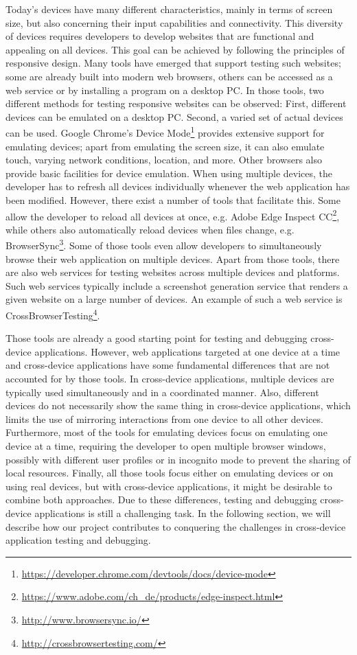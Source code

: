 Today's devices have many different characteristics, mainly in terms of screen size, but also concerning their input capabilities and connectivity. This diversity of devices requires developers to develop websites that are functional and appealing on all devices. This goal can be achieved by following the principles of responsive design. Many tools have emerged that support testing such websites; some are already built into modern web browsers, others can be accessed as a web service or by installing a program on a desktop PC. In those tools, two different methods for testing responsive websites can be observed: First, different devices can be emulated on a desktop PC. Second, a varied set of actual devices can be used. Google Chrome's Device Mode\footnote{\url{https://developer.chrome.com/devtools/docs/device-mode}} provides extensive support for emulating devices; apart from emulating the screen size, it can also emulate touch, varying network conditions, location, and more. Other browsers also provide basic facilities for device emulation. When using multiple devices, the developer has to refresh all devices individually whenever the web application has been modified. However, there exist a number of tools that facilitate this. Some allow the developer to reload all devices at once, e.g. Adobe Edge Inspect CC\footnote{\url{https://www.adobe.com/ch_de/products/edge-inspect.html}}, while others also automatically reload devices when files change, e.g. BrowserSync\footnote{\url{http://www.browsersync.io/}}. Some of those tools even allow developers to simultaneously browse their web application on multiple devices. Apart from those tools, there are also web services for testing websites across multiple devices and platforms. Such web services typically include a screenshot generation service that renders a given website on a large number of devices. An example of such a web service is CrossBrowserTesting\footnote{\url{http://crossbrowsertesting.com/}}.

Those tools are already a good starting point for testing and debugging cross-device applications. However, web applications targeted at one device at a time and cross-device applications have some fundamental differences that are not accounted for by those tools. In cross-device applications, multiple devices are typically used simultaneously and in a coordinated manner. Also, different devices do not necessarily show the same thing in cross-device applications, which limits the use of mirroring interactions from one device to all other devices. Furthermore, most of the tools for emulating devices focus on emulating one device at a time, requiring the developer to open multiple browser windows, possibly with different user profiles or in incognito mode to prevent the sharing of local resources. Finally, all those tools focus either on emulating devices or on using real devices, but with cross-device applications, it might be desirable to combine both approaches. Due to these differences, testing and debugging cross-device applications is still a challenging task. In the following section, we will describe how our project contributes to conquering the challenges in cross-device application testing and debugging.

